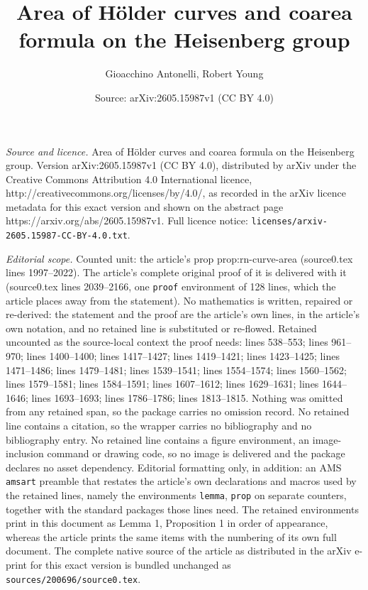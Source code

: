 \documentclass[10pt,a4paper]{amsart}
\title{Area of H\"older curves and coarea formula on the Heisenberg group}
\author{Gioacchino Antonelli, Robert Young}
\date{Source: arXiv:2605.15987v1 (CC BY 4.0)}
\begin{document}
\maketitle

\noindent\emph{Source and licence.} Area of H\"older curves and coarea formula on the Heisenberg group. Version arXiv:2605.15987v1 (CC BY 4.0), distributed by arXiv under the Creative Commons Attribution 4.0 International licence, http://creativecommons.org/licenses/by/4.0/, as recorded in the arXiv licence metadata for this exact version and shown on the abstract page https://arxiv.org/abs/2605.15987v1. Full licence notice: \texttt{licenses/arxiv-2605.15987-CC-BY-4.0.txt}.\par\smallskip

\noindent\textit{Editorial scope.} Counted unit: the article's prop prop:rn-curve-area (source0.tex lines 1997--2022). The article's complete original proof of it is delivered with it (source0.tex lines 2039--2166, one \texttt{proof} environment of 128 lines, which the article places away from the statement). No mathematics is written, repaired or re-derived: the statement and the proof are the article's own lines, in the article's own notation, and no retained line is substituted or re-flowed.  Retained uncounted as the source-local context the proof needs: lines 538--553; lines 961--970; lines 1400--1400; lines 1417--1427; lines 1419--1421; lines 1423--1425; lines 1471--1486; lines 1479--1481; lines 1539--1541; lines 1554--1574; lines 1560--1562; lines 1579--1581; lines 1584--1591; lines 1607--1612; lines 1629--1631; lines 1644--1646; lines 1693--1693; lines 1786--1786; lines 1813--1815.  Nothing was omitted from any retained span, so the package carries no omission record.  No retained line contains a citation, so the wrapper carries no bibliography and no bibliography entry.  No retained line contains a figure environment, an image-inclusion command or drawing code, so no image is delivered and the package declares no asset dependency.  Editorial formatting only, in addition: an AMS \texttt{amsart} preamble that restates the article's own declarations and macros used by the retained lines, namely the environments \texttt{lemma}, \texttt{prop} on separate counters, together with the standard packages those lines need.  The retained environments print in this document as Lemma 1, Proposition 1 in order of appearance, whereas the article prints the same items with the numbering of its own full document.  The complete native source of the article as distributed in the arXiv e-print for this exact version is bundled unchanged as \texttt{sources/200696/source0.tex}.
\end{document}

